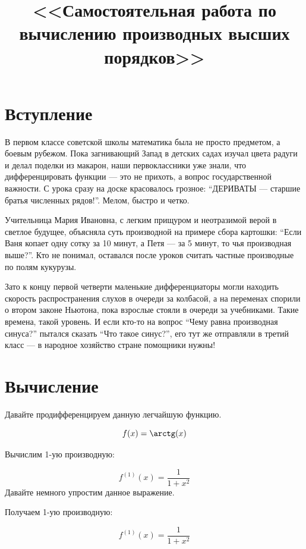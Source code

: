 \documentclass[12pt,a4paper]{extreport}
\title{<<Самостоятельная работа по вычислению производных высших порядков>>}
\begin{document}
\maketitle
\pagebreak
\tableofcontents
\pagebreak
\section{Вступление}
В первом классе советской школы математика была не просто предметом, а боевым рубежом. Пока загнивающий Запад в детских садах изучал цвета радуги и делал поделки из макарон, наши первоклассники уже знали, что дифференцировать функции — это не прихоть, а вопрос государственной важности. С урока сразу на доске красовалось грозное: “ДЕРИВАТЫ — старшие братья численных рядов!”. Мелом, быстро и четко. 

Учительница Мария Ивановна, с легким прищуром и неотразимой верой в светлое будущее, объясняла суть производной на примере сбора картошки: “Если Ваня копает одну сотку за 10 минут, а Петя — за 5 минут, то чья производная выше?”. Кто не понимал, оставался после уроков считать частные производные по полям кукурузы.



Зато к концу первой четверти маленькие дифференциаторы могли находить скорость распространения слухов в очереди за колбасой, а на переменах спорили о втором законе Ньютона, пока взрослые стояли в очереди за учебниками. Такие времена, такой уровень. И если кто-то на вопрос “Чему равна производная синуса?” пытался сказать “Что такое синус?”, его тут же отправляли в третий класс — в народное хозяйство стране помощники нужны!\section{Вычисление}


Давайте продифференцируем данную легчайшую функцию.

\begin{dmath*}
f(x) = \arctg(x)
\end{dmath*}

Вычислим 1-ую производную:

\begin{dmath*}
f^{(1)}(x) = \frac{1}{1 + {x}^{2}}
\end{dmath*}
Давайте немного упростим данное выражение.


Получаем 1-ую производную:

\begin{dmath*}
f^{(1)}(x) = \frac{1}{1 + {x}^{2}}
\end{dmath*}
\end{document}
